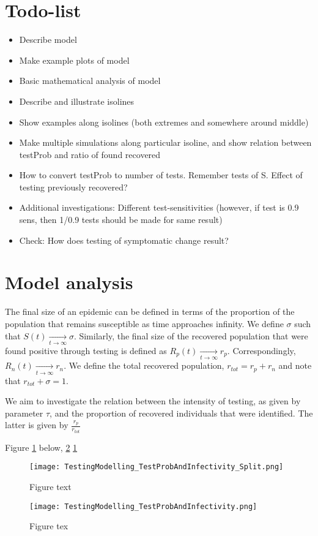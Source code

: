 \documentclass[10pt,a4paper]{article}
\begin{document}
\section*{Todo-list}

\begin{itemize}
\item Describe model
\item Make example plots of model 
\item Basic mathematical analysis of model
\item Describe and illustrate isolines
\item Show examples along isolines (both extremes and somewhere around middle)
\item Make multiple simulations along particular isoline, and show relation between testProb and ratio of found recovered
\item How to convert testProb to number of tests. Remember tests of S. Effect of testing previously recovered?
\item Additional investigations: Different test-sensitivities (however, if test is 0.9 sens, then 1/0.9 tests should be made for same result)
\item Check: How does testing of symptomatic change result?
\end{itemize}




\section{Model analysis}
The final size of an epidemic can be defined in terms of the proportion of the population that remains susceptible as time approaches infinity. 
We define $\sigma$ such that $S(t) \underset{t\rightarrow \infty}{\rightarrow} \sigma$. 
Similarly, the final size of the recovered population that were found positive through testing is defined as $R_p(t) \underset{t\rightarrow \infty}{\rightarrow} r_p$. 
Correspondingly, $R_n(t) \underset{t\rightarrow \infty}{\rightarrow} r_n$.  
We define the total recovered population, $r_{tot} = r_p + r_n$ and note that $r_{tot} + \sigma = 1$.

We aim to investigate the relation between the intensity of testing, as given by parameter $\tau$, and the proportion of recovered individuals that were identified. 
The latter is given by $\frac{r_p}{r_{tot}}$ 

Figure \ref{fig:TestAndBeta} below, \ref{fig:TestAndBetaComb}  \ref{fig:TestAndBeta}

\begin{figure}\centering
    \label{fig:TestAndBeta}\caption{Figure text}
    \texttt{[image: TestingModelling\_TestProbAndInfectivity\_Split.png]}
\end{figure}

\begin{figure}\centering
    \texttt{[image: TestingModelling\_TestProbAndInfectivity.png]}
    \label{fig:TestAndBetaComb}\caption{Figure tex}
\end{figure}
\end{document}
